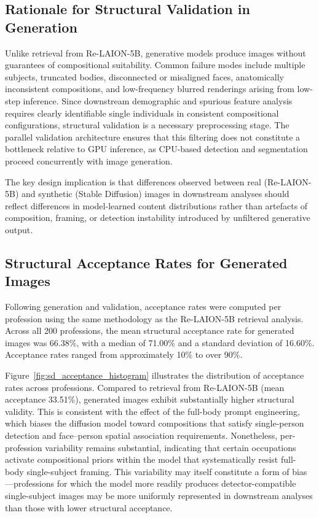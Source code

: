\subsection{Rationale for Structural Validation in Generation}

Unlike retrieval from Re-LAION-5B, generative models produce images without guarantees of compositional suitability. Common failure modes include multiple subjects, truncated bodies, disconnected or misaligned faces, anatomically inconsistent compositions, and low-frequency blurred renderings arising from low-step inference. Since downstream demographic and spurious feature analysis requires clearly identifiable single individuals in consistent compositional configurations, structural validation is a necessary preprocessing stage. The parallel validation architecture ensures that this filtering does not constitute a bottleneck relative to GPU inference, as CPU-based detection and segmentation proceed concurrently with image generation.

The key design implication is that differences observed between real (Re-LAION-5B) and synthetic (Stable Diffusion) images in downstream analyses should reflect differences in model-learned content distributions rather than artefacts of composition, framing, or detection instability introduced by unfiltered generative output.

\subsection{Structural Acceptance Rates for Generated Images}

Following generation and validation, acceptance rates were computed per profession using the same methodology as the Re-LAION-5B retrieval analysis. Across all 200 professions, the mean structural acceptance rate for generated images was 66.38\%, with a median of 71.00\% and a standard deviation of 16.60\%. Acceptance rates ranged from approximately 10\% to over 90\%.

Figure~\ref{fig:sd_acceptance_histogram} illustrates the distribution of acceptance rates across professions. Compared to retrieval from Re-LAION-5B (mean acceptance 33.51\%), generated images exhibit substantially higher structural validity. This is consistent with the effect of the full-body prompt engineering, which biases the diffusion model toward compositions that satisfy single-person detection and face--person spatial association requirements. Nonetheless, per-profession variability remains substantial, indicating that certain occupations activate compositional priors within the model that systematically resist full-body single-subject framing. This variability may itself constitute a form of bias---professions for which the model more readily produces detector-compatible single-subject images may be more uniformly represented in downstream analyses than those with lower structural acceptance.

